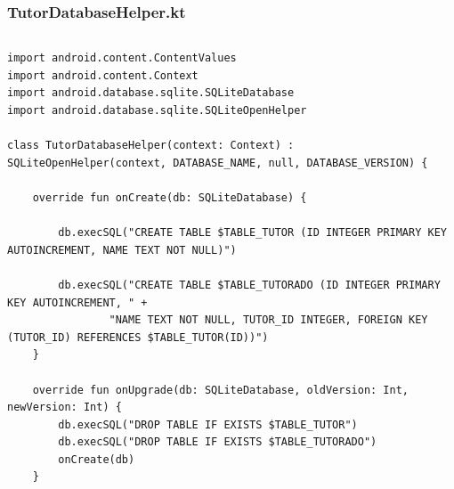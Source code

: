 \documentclass[pdf,
serif,
compress,
xcolor=table,
dvipsnames,
spanish,
aspectratio=169]{beamer}
\begin{document}
\begin{frame}[fragile]
    \frametitle{TutorDatabaseHelper.kt}
\begin{columns}
\begin{verbatim}
import android.content.ContentValues
import android.content.Context
import android.database.sqlite.SQLiteDatabase
import android.database.sqlite.SQLiteOpenHelper

class TutorDatabaseHelper(context: Context) : SQLiteOpenHelper(context, DATABASE_NAME, null, DATABASE_VERSION) {

    override fun onCreate(db: SQLiteDatabase) {
        
        db.execSQL("CREATE TABLE $TABLE_TUTOR (ID INTEGER PRIMARY KEY AUTOINCREMENT, NAME TEXT NOT NULL)")
        
        db.execSQL("CREATE TABLE $TABLE_TUTORADO (ID INTEGER PRIMARY KEY AUTOINCREMENT, " +
                "NAME TEXT NOT NULL, TUTOR_ID INTEGER, FOREIGN KEY (TUTOR_ID) REFERENCES $TABLE_TUTOR(ID))")
    }

    override fun onUpgrade(db: SQLiteDatabase, oldVersion: Int, newVersion: Int) {
        db.execSQL("DROP TABLE IF EXISTS $TABLE_TUTOR")
        db.execSQL("DROP TABLE IF EXISTS $TABLE_TUTORADO")
        onCreate(db)
    }
\end{verbatim}
\end{columns}
\end{frame}

\end{document}
